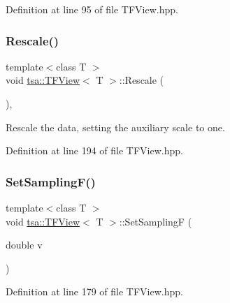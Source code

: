 Definition at line 95 of file T\+F\+View.\+hpp.

\mbox{\label{classtsa_1_1_t_f_view_ac93678cadb31386dfffd7e9e0ce2fb0b}} 
\subsubsection{\texorpdfstring{Rescale()}{Rescale()}}
{\footnotesize\ttfamily template$<$class T $>$ \\
void \hyperlink{classtsa_1_1_t_f_view}{tsa\+::\+T\+F\+View}$<$ T $>$\+::Rescale (\begin{DoxyParamCaption}{ }\end{DoxyParamCaption})\hspace{0.3cm}{\ttfamily [inline]}, {\ttfamily [protected]}}

Rescale the data, setting the auxiliary scale to one. 

Definition at line 194 of file T\+F\+View.\+hpp.

\mbox{\label{classtsa_1_1_t_f_view_abb1df435da547728dbb1ff762c3a38be}} 
\subsubsection{\texorpdfstring{Set\+Sampling\+F()}{SetSamplingF()}}
{\footnotesize\ttfamily template$<$class T $>$ \\
void \hyperlink{classtsa_1_1_t_f_view}{tsa\+::\+T\+F\+View}$<$ T $>$\+::Set\+SamplingF (\begin{DoxyParamCaption}\item[{double}]{v }\end{DoxyParamCaption})\hspace{0.3cm}{\ttfamily [inline]}}



Definition at line 179 of file T\+F\+View.\+hpp.

\mbox{\label{classtsa_1_1_t_f_view_a1f77299b852922b33ffae367df01988c}} 
